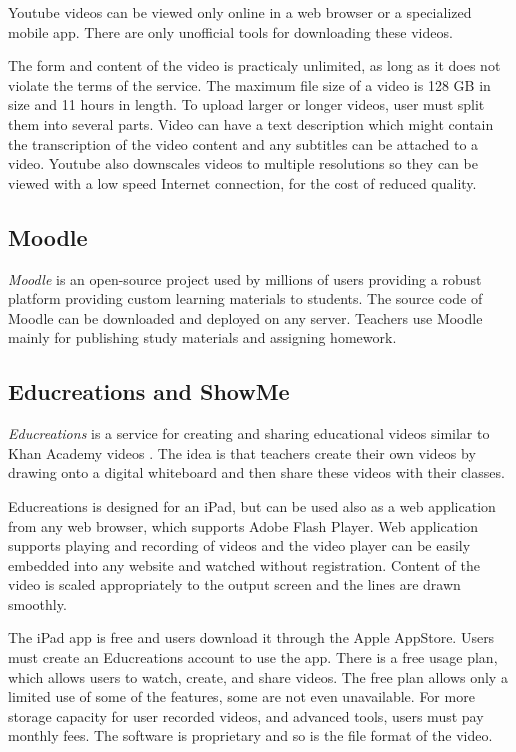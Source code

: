 Youtube videos can be viewed only online in a web browser or a specialized mobile app. There are only unofficial tools for downloading these videos.

The form and content of the video is practicaly unlimited, as long as it does not violate the terms of the service. The maximum file size of a video is 128 GB in size and 11 hours in length. To upload larger or longer videos, user must split them into several parts. Video can have a text description which might contain the transcription of the video content and any subtitles can be attached to a video. Youtube also downscales videos to multiple resolutions so they can be viewed with a low speed Internet connection, for the cost of reduced quality.



\subsection{Moodle}
\textit{Moodle} \cite{moodle} is an open-source project used by millions of users \cite{moodle_usage} providing a robust platform providing custom learning materials to students. The source code of Moodle can be downloaded and deployed on any server. Teachers use Moodle mainly for publishing study materials and assigning homework.



\subsection{Educreations and ShowMe}
\textit{Educreations} is a service for creating and sharing educational videos similar to Khan Academy videos \cite{educreations}. The idea is that teachers create their own videos by drawing onto a digital whiteboard and then share these videos with their classes.

Educreations is designed for an iPad, but can be used also as a web application from any web browser, which supports Adobe Flash Player. Web application supports playing and recording of videos and the video player can be easily embedded into any website and watched without registration. Content of the video is scaled appropriately to the output screen and the lines are drawn smoothly.

The iPad app is free and users download it through the Apple AppStore. Users must create an Educreations account to use the app. There is a free usage plan, which allows users to watch, create, and share videos. The free plan allows only a limited use of some of the features, some are not even unavailable. For more storage capacity for user recorded videos, and advanced tools, users must pay monthly fees. The software is proprietary and so is the file format of the video.

